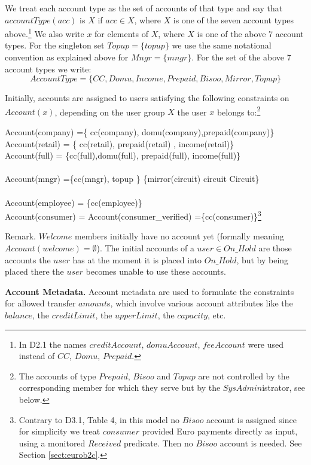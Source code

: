 We treat each account type as the set of accounts of that type and say that $accountType(acc)$ is $X$ if $acc \in X$, where $X$ is one of the seven account types above.\footnote{In D2.1 the names $creditAccount$, $domuAccount$, $feeAccount$ were used instead of $CC$, $Domu$, $Prepaid$.} We also write $x$ for elements of $X$, where $X$ is one of the above 7 account types. For the singleton set $Topup=\{topup\}$ we use the same notational convention as explained above for $Mngr=\{mngr\}$. For the set of the above 7 account types we write:
\[AccountType=\{CC,Domu,Income,Prepaid,Bisoo,Mirror,Topup\} \]

Initially, accounts are assigned to users satisfying the following constraints on $Account(x)$, depending on the user group $X$ the user $x$ belongs to:\footnote{The accounts of type $Prepaid$, $Bisoo$ and $Topup$ are not controlled by the corresponding member for which they serve but by the $SysAdmin$istrator, see below.
}

\begin{asm}
Account(company) =\{ cc(company), domu(company),prepaid(company)\}  \\
Account(retail) = \{ cc(retail), prepaid(retail) , income(retail)\}\\
Account(full) =
\{cc(full),domu(full), prepaid(full), income(full)\}\\ 
\\
 Account(mngr) =\{cc(mngr), topup \} \cup 
    \{mirror(circuit) \mid circuit \in Circuit\}\\
\\
Account(employee) = \{cc(employee)\}\\
Account(consumer) = Account(consumer\_verified)              
              =\{cc(consumer)\}\footnote{Contrary to D3.1, Table 4, in this model no $Bisoo$ account is assigned since for simplicity we treat $consumer$ provided Euro payments directly as input, using a monitored $Received$ predicate. Then no $Bisoo$ account is needed. See Section \ref{sect:eurob2c}.}
\end{asm}

Remark. $Welcome$ members initially have no account yet (formally meaning  $Account(welcome)=\emptyset$). The initial accounts of a 
$user \in On\_Hold$ are those accounts the $user$ has at the moment it is placed into $On\_Hold$, but by being placed there the $user$ becomes unable to use these accounts.

{\bf Account Metadata.} Account metadata are used to formulate the constraints for allowed transfer $amount$s, which involve various account attributes like the $balance$, the $creditLimit$, the $upperLimit$, the $capacity$, etc. 

